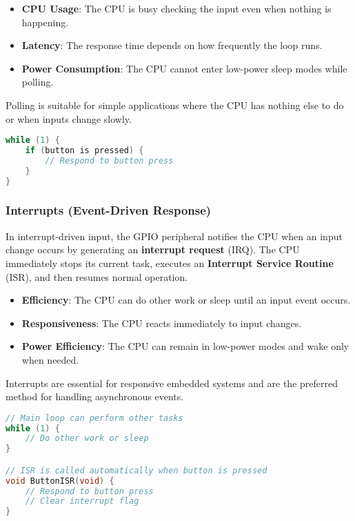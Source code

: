\begin{itemize}[nosep]
  \item \textbf{CPU Usage}: The CPU is busy checking the input even when nothing is happening.
  \item \textbf{Latency}: The response time depends on how frequently the loop runs.
  \item \textbf{Power Consumption}: The CPU cannot enter low-power sleep modes while polling.
\end{itemize}

\noindent
Polling is suitable for simple applications where the CPU has nothing else to do or when inputs change slowly.

\begin{lstlisting}[caption={Polling Example (Conceptual)}, language=C]
while (1) {
    if (button is pressed) {
        // Respond to button press
    }
}
\end{lstlisting}

\subsubsection{Interrupts (Event-Driven Response)}

In interrupt-driven input, the GPIO peripheral notifies the CPU when an input change occurs by generating an \textbf{interrupt request} (IRQ). The CPU immediately stops its current task, executes an \textbf{Interrupt Service Routine} (ISR), and then resumes normal operation.

\begin{itemize}[nosep]
  \item \textbf{Efficiency}: The CPU can do other work or sleep until an input event occurs.
  \item \textbf{Responsiveness}: The CPU reacts immediately to input changes.
  \item \textbf{Power Efficiency}: The CPU can remain in low-power modes and wake only when needed.
\end{itemize}

\noindent
Interrupts are essential for responsive embedded systems and are the preferred method for handling asynchronous events.

\begin{lstlisting}[caption={Interrupt Example (Conceptual)}, language=C]
// Main loop can perform other tasks
while (1) {
    // Do other work or sleep
}

// ISR is called automatically when button is pressed
void ButtonISR(void) {
    // Respond to button press
    // Clear interrupt flag
}
\end{lstlisting}

